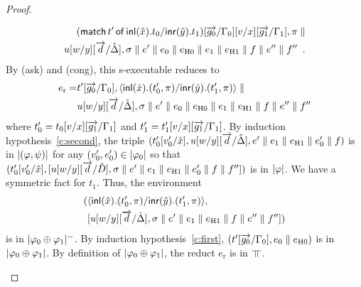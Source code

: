 \begin{proof}
\begin{description}
\begin{enumerate}[label=\textit{(\arabic{*})}]
\begin{description}
\begin{eqnarray*}
                     (\mathsf{match}\,{t'}\,\mathsf{of}\, \mathsf{inl}({\hat x}). {t_0}/ \mathsf{inr}({\hat
                      y}). {t_1})[\overrightarrow{g_0}/\Gamma_0][v/x][\overrightarrow{g_1}/\Gamma_1],\pi\parallel \\
                     u[w/y][\overrightarrow d/\hat{\Delta}],\sigma\parallel e'\parallel
                      {e_0\parallel e_{\mathrm{H0}}}\parallel {e_1\parallel e_{\mathrm{H1}}}\parallel f\parallel e''\parallel f''\enspace.
                    \end{eqnarray*}
                    By (ask) and (cong), this s-executable reduces to
                    \begin{align*}
                     e_{\mathrm r} =&
                      t'[\overrightarrow{g_0}/\Gamma_0],
                      \langle \mathsf{inl}({\hat x}). ({t_0'},{\pi})/ \mathsf{inr}({\hat y}). ({t_1'},{\pi})\rangle\parallel \\
                     &u[w/y][\overrightarrow d/\hat{\Delta}],\sigma\parallel e'\parallel
                      {e_0\parallel e_{\mathrm{H0}}}\parallel {e_1\parallel e_{\mathrm{H1}}}\parallel  f\parallel e''\parallel f''
                    \end{align*}
		    where $t_0' = t_0[v/x][\overrightarrow{g_1}/\Gamma_1]$ and $t_1' =
		    t_1'[v/x][\overrightarrow{g_1}/\Gamma_1]$.
                    By induction hypothesis~\ref{c:second},
                    the triple
                    $(t_0'[v_0'/\hat x],
                    u[w/y][\overrightarrow d/\hat {\Delta}], e'\parallel {e_1\parallel e_{\mathrm{H1}}}\parallel
                    e_0'\parallel  f)$ is in $|{(\varphi,\psi)}|$ for any
                    $(v_0',e_0')\in|{\varphi_0}|$ so
                    that
                    $(t_0'[v_0'/\hat x],
                    [u[w/y][\overrightarrow d/\hat D],\sigma\parallel e'\parallel
                    {e_1\parallel e_{\mathrm{H1}}}\parallel e_0'\parallel {f}\parallel f''])$ is in
                    $|{\varphi}|$.
                    We have a symmetric fact for $t_1$.
                    Thus, the environment
                    \begin{align*}
                    (&
                     \langle \mathsf{inl}({\hat x}). ({t_0'},{\pi})/ \mathsf{inr}({\hat y}). ({t_1'},{\pi})\rangle,\\
                     & [u[w/y][\overrightarrow{d}/\hat{\Delta}],\sigma\parallel e'\parallel {e_1\parallel e_{\mathrm{H1}}}\parallel
                      f\parallel e''\parallel f'']
                    )
                    \end{align*}
                    is in $|{\varphi_0\oplus\varphi_1}|^-$\kern -2pt.
                    By induction hypothesis~\ref{c:first},
                    $(t'[\overrightarrow{g_0}/\Gamma_0],{e_0\parallel e_{\mathrm{H0}}})$ is in
                    $|{\varphi_0\oplus\varphi_1}|$.
                    By definition of $|{\varphi_0\oplus\varphi_1}|$,
                    the reduct $e_{\mathrm r}$ is in $\bbot$.

\end{description}
\end{enumerate}
\end{description}
\end{proof}
